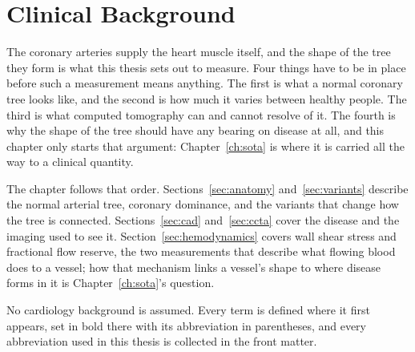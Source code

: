 
\chapter{Clinical Background}
\label{ch:clinical}

The coronary arteries supply the heart muscle itself, and the shape of the tree they form is what
this thesis sets out to measure.
Four things have to be in place before such a measurement means anything.
The first is what a normal coronary tree looks like, and the second is how much it varies between
healthy people.
The third is what computed tomography can and cannot resolve of it.
The fourth is why the shape of the tree should have any bearing on disease at all, and this chapter
only starts that argument: Chapter~\ref{ch:sota} is where it is carried all the way to a clinical
quantity.

The chapter follows that order.
Sections~\ref{sec:anatomy} and~\ref{sec:variants} describe the normal arterial tree, coronary
dominance, and the variants that change how the tree is connected.
Sections~\ref{sec:cad} and~\ref{sec:ccta} cover the disease and the imaging used to see it.
Section~\ref{sec:hemodynamics} covers wall shear stress and fractional flow reserve, the two
measurements that describe what flowing blood does to a vessel; how that mechanism links a vessel's
shape to where disease forms in it is Chapter~\ref{ch:sota}'s question.

No cardiology background is assumed.
Every term is defined where it first appears, set in bold there with its abbreviation in
parentheses, and every abbreviation used in this thesis is collected in the front matter.
